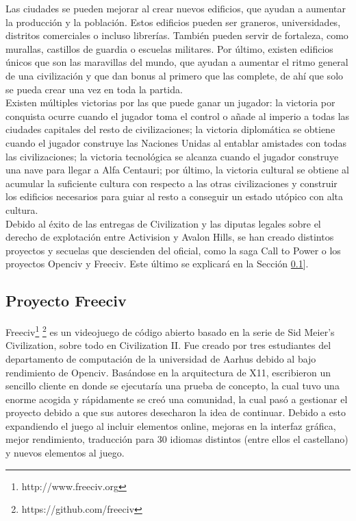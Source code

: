 Las ciudades se pueden mejorar al crear nuevos edificios, que ayudan a aumentar la producción y la población. Estos edificios pueden ser graneros, universidades, distritos comerciales o incluso librerías. También pueden servir de fortaleza, como murallas, castillos de guardia o escuelas militares. Por último, existen edificios únicos que son las maravillas del mundo, que ayudan a aumentar el ritmo general de una civilización y que dan bonus al primero que las complete, de ahí que solo se pueda crear una vez en toda la partida. \\

Existen múltiples victorias por las que puede ganar un jugador: la victoria por conquista ocurre cuando el jugador toma el control o añade al imperio a todas las ciudades capitales del resto de civilizaciones; la victoria diplomática se obtiene cuando el jugador construye las Naciones Unidas al entablar amistades con todas las civilizaciones; la victoria tecnológica se alcanza cuando el jugador construye una nave para llegar a Alfa Centauri; por último, la victoria cultural se obtiene al acumular la suficiente cultura con respecto a las otras civilizaciones y construir los edificios necesarios para guiar al resto a conseguir un estado utópico con alta cultura. \\

Debido al éxito de las entregas de Civilization y las diputas legales sobre el derecho de explotación entre Activision y Avalon Hills, se han creado distintos proyectos y secuelas que descienden del oficial, como la saga Call to Power o los proyectos Openciv y Freeciv. Este último se explicará en la Sección \ref{subsec:freeciv}].

\subsection{Proyecto Freeciv}\label{subsec:freeciv}

Freeciv\footnote{http://www.freeciv.org} \footnote{https://github.com/freeciv} es un videojuego de código abierto basado en la serie de Sid Meier's Civilization, sobre todo en Civilization II. Fue creado por tres estudiantes del departamento de computación de la universidad de Aarhus debido al bajo rendimiento de Openciv. Basándose en la arquitectura de X11, escribieron un sencillo cliente en donde se ejecutaría una prueba de concepto, la cual tuvo una enorme acogida y rápidamente se creó una comunidad, la cual pasó a gestionar el proyecto debido a que sus autores desecharon la idea de continuar. Debido a esto expandiendo el juego al incluir elementos online, mejoras en la interfaz gráfica, mejor rendimiento, traducción para 30 idiomas distintos (entre ellos el castellano) y nuevos elementos al juego. \\

